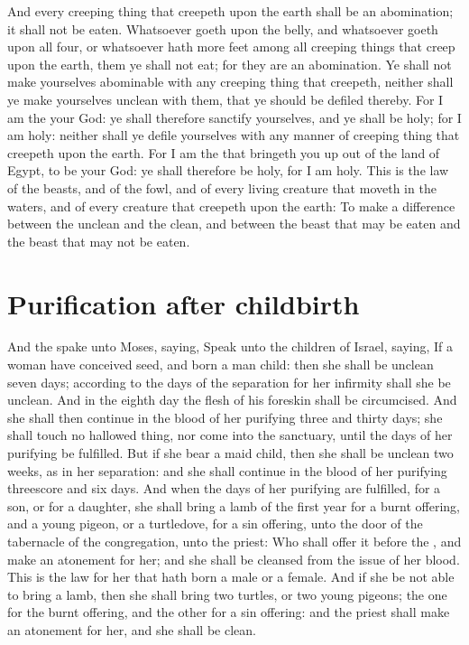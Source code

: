 \begin{biblechapter}
\verse And every creeping thing that creepeth upon the earth shall be an abomination; it shall not be eaten.
\verse Whatsoever goeth upon the belly, and whatsoever goeth upon all four, or whatsoever hath more feet among all creeping things that creep upon the earth, them ye shall not eat; for they are an abomination.
\verse Ye shall not make yourselves abominable with any creeping thing that creepeth, neither shall ye make yourselves unclean with them, that ye should be defiled thereby.
\verse For I am the \LORD your God: ye shall therefore sanctify yourselves, and ye shall be holy; for I am holy: neither shall ye defile yourselves with any manner of creeping thing that creepeth upon the earth.
\verse For I am the \LORD that bringeth you up out of the land of Egypt, to be your God: ye shall therefore be holy, for I am holy.
\verse This is the law of the beasts, and of the fowl, and of every living creature that moveth in the waters, and of every creature that creepeth upon the earth:
\verse To make a difference between the unclean and the clean, and between the beast that may be eaten and the beast that may not be eaten.
\end{biblechapter}

\section*{Purification after childbirth}
\begin{biblechapter} %
\verse And the \LORD spake unto Moses, saying,
\verse Speak unto the children of Israel, saying, If a woman have conceived seed, and born a man child: then she shall be unclean seven days; according to the days of the separation for her infirmity shall she be unclean.
\verse And in the eighth day the flesh of his foreskin shall be circumcised.
\verse And she shall then continue in the blood of her purifying three and thirty days; she shall touch no hallowed thing, nor come into the sanctuary, until the days of her purifying be fulfilled.
\verse But if she bear a maid child, then she shall be unclean two weeks, as in her separation: and she shall continue in the blood of her purifying threescore and six days.
\verse And when the days of her purifying are fulfilled, for a son, or for a daughter, she shall bring a lamb of the first year for a burnt offering, and a young pigeon, or a turtledove, for a sin offering, unto the door of the tabernacle of the congregation, unto the priest:
\verse Who shall offer it before the \LORD, and make an atonement for her; and she shall be cleansed from the issue of her blood. This is the law for her that hath born a male or a female.
\verse And if she be not able to bring a lamb, then she shall bring two turtles, or two young pigeons; the one for the burnt offering, and the other for a sin offering: and the priest shall make an atonement for her, and she shall be clean.
\end{biblechapter}

